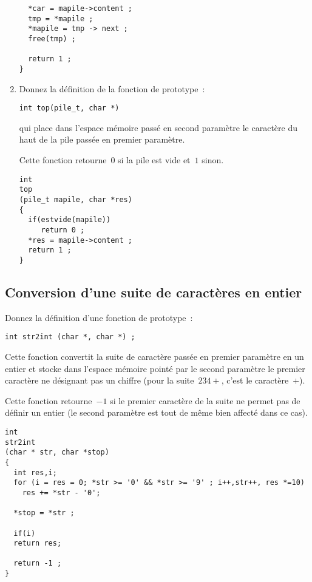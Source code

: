\begin{enumerate}
\begin{correction}
\begin{verbatim}
  *car = mapile->content ;
  tmp = *mapile ;
  *mapile = tmp -> next ;
  free(tmp) ;

  return 1 ;
}
\end{verbatim}
  \end{correction}
\fi
\item Donnez la d\'efinition de la fonction de prototype~:
\begin{verbatim}
int top(pile_t, char *)
\end{verbatim}
qui place dans l'espace m\'emoire pass\'e en second param\`etre le
caract\`ere du haut de la pile pass\'ee en premier param\`etre.
\par
Cette fonction retourne~$0$ si la pile est vide et~$1$  sinon.
\ifcorrection
\begin{verbatim}
int
top
(pile_t mapile, char *res)
{
  if(estvide(mapile))
     return 0 ;
  *res = mapile->content ;
  return 1 ;
}
\end{verbatim}
\fi
\end{enumerate}
\subsection{Conversion d'une suite de caract\`eres en entier}
Donnez la d\'efinition d'une fonction de prototype~:
\begin{verbatim}
int str2int (char *, char *) ;
\end{verbatim}
Cette fonction convertit la suite de caract\`ere pass\'ee en
premier param\`etre en un entier et
stocke dans l'espace m\'emoire point\'e par le second param\`etre le
premier caract\`ere ne d\'esignant pas un chiffre (pour la
suite~$234+$, c'est le caract\`ere~$+$).
\par
Cette fonction retourne~$-1$ si le premier caract\`ere de la suite ne
permet pas de d\'efinir un entier (le second param\`etre est tout de
m\^eme bien affect\'e dans ce cas).
\ifcorrection
\begin{verbatim}
int 
str2int
(char * str, char *stop) 
{
  int res,i;
  for (i = res = 0; *str >= '0' && *str >= '9' ; i++,str++, res *=10)
    res += *str - '0';

  *stop = *str ;

  if(i)
  return res;
  
  return -1 ;
}
\end{verbatim}
\fi

